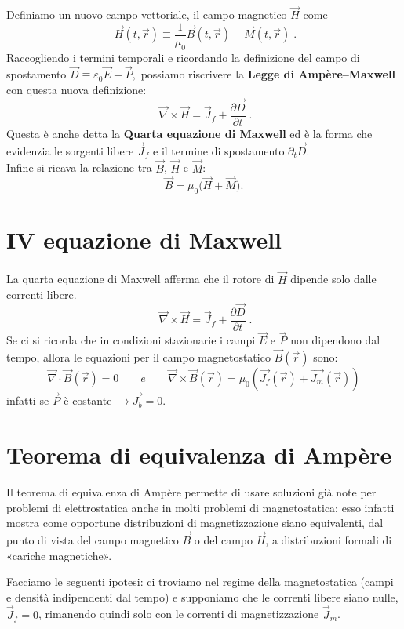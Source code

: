 \documentclass{book}
\begin{document}
 Definiamo un nuovo campo vettoriale, il campo magnetico \(\vec{H}\) come
\[
\boxed{\;\vec{H}(t,\vec{r}) \equiv \frac{1}{\mu_0}\vec{B}(t,\vec{r}) - \vec{M}(t,\vec{r})\; }.
\]
Raccogliendo i termini temporali e ricordando la definizione del campo di spostamento $
\vec{D} \equiv \varepsilon_0\vec{E} + \vec{P},
$ possiamo riscrivere la \textbf{Legge di Ampère--Maxwell} con questa nuova definizione:
\[
\boxed{\;\vec{\nabla}\times\vec{H} = \vec{J}_{\!f} + \frac{\partial\vec{D}}{\partial t}\; }.
\]
Questa è anche detta la \textbf{Quarta equazione di Maxwell} ed è la forma che evidenzia le sorgenti libere \(\vec{J}_{\!f}\) e il termine di spostamento \(\partial_t\vec{D}\).
\\
Infine si ricava la relazione tra \(\vec{B}\), \(\vec{H}\) e \(\vec{M}\):
\[
\vec{B} = \mu_0\bigl(\vec{H} + \vec{M}\bigr).
\]

\section{IV equazione di Maxwell}
La quarta equazione di Maxwell afferma che il rotore di $\vec{H}$ dipende solo dalle correnti libere.
\[
\boxed{\;\vec{\nabla}\times\vec{H} = \vec{J}_{\!f} + \frac{\partial\vec{D}}{\partial t}\; }.
\]
Se ci si ricorda che in condizioni stazionarie i campi $\vec{E}$ e $\vec{P}$ non dipendono dal tempo, allora le equazioni per il campo magnetostatico $\vec{B}(\vec{r})$ sono:
$$
\vec{\nabla}\cdot\vec{B}(\vec{r})=0
\qquad e
\qquad
\vec{\nabla}\times\vec{B}(\vec{r}) = \mu_0 \left(\vec{J_f}(\vec{r}) + \vec{J_m}(\vec{r})\right)
$$
infatti se $\vec{P}$ è costante $\to \vec{J_b}=0$.

\section{Teorema di equivalenza di Amp\`ere}
Il teorema di equivalenza di Ampère permette di usare soluzioni già note per problemi di elettrostatica anche in molti problemi di magnetostatica: esso infatti mostra come opportune distribuzioni di magnetizzazione siano equivalenti, dal punto di vista del campo magnetico \(\vec{B}\) o del campo \(\vec{H}\), a distribuzioni formali di «cariche magnetiche».

Facciamo le seguenti ipotesi: ci troviamo nel regime della magnetostatica (campi e densità indipendenti dal tempo) e supponiamo che le correnti libere siano nulle, \(\vec{J}_{\!f}=0\), rimanendo quindi solo con le correnti di magnetizzazione \(\vec{J}_m\).
\end{document}

